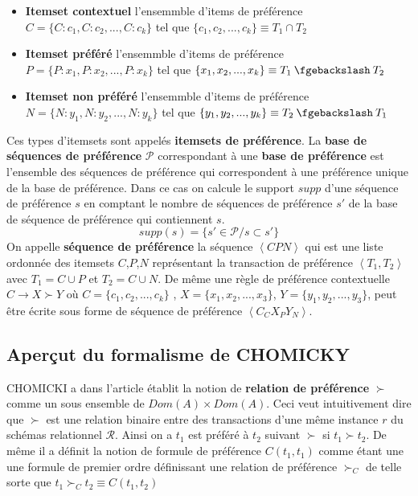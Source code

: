 \documentclass[a4paper,12pt,openany,oneside]{article}
\newcommand{\mysetminus}{\mathbin{\fgebackslash}}
\begin{document}
\begin{itemize}
\item \textbf{Itemset contextuel} l'ensemmble d'items de préférence $C=\{C:c_1,C:c_2,...,C:c_k\}$ tel que $\{c_1,c_2,...,c_k\}\equiv T_1\cap T_2$
\item \textbf{Itemset préféré} l'ensemmble d'items de préférence $P=\{P:x_1,P:x_2,...,P:x_k\}$ tel que $\{x_1,x_2,...,x_k\}\equiv T_1 \mysetminus T_2$
\item \textbf{Itemset non préféré} l'ensemmble d'items de préférence $N=\{N:y_1,N:y_2,...,N:y_k\}$ tel que $\{y_1,y_2,...,y_k\}\equiv T_2\mysetminus T_1$
\end{itemize} 
Ces types d'itemsets sont appelés \textbf{itemsets de préférence}.
La \textbf{base de séquences de préférence} $\mathcal{P}$ correspondant à une \textbf{base de préférence} est l'ensemble des séquences de préférence qui correspondent à une préférence unique de la base de préférence.
Dans ce cas on calcule le support $supp$ d'une séquence de préférence $s$ en comptant le nombre de séquences de préférence $s'$ de la base de séquence de préférence qui contiennent $s$.  
\[
	supp(s)=\{s'\in \mathcal{P}/s\subset s'\}
\]
On appelle \textbf{séquence de préférence} la séquence $\left<CPN\right>$ qui est une liste ordonnée des itemsets $C$,$P$,$N$ représentant la transaction de préférence $\left<T_1,T_2\right>$ avec $T_1=C\cup P$ et $T_2=C\cup N$. De même une règle de préférence contextuelle $C\rightarrow X\succ Y$ où $C=\{c_1,c_2,...,c_k\}$ , $X=\{x_1,x_2,...,x_3\}$, $Y=\{y_1,y_2,...,y_3\}$, peut être écrite sous forme de séquence de préférence $\left<C_C X_P Y_N\right>$.

\subsection{Aperçut du formalisme de CHOMICKY}
 	CHOMICKI a dans l'article \cite{CHO} établit la notion de \textbf{relation de préférence} $\succ$ comme un  sous ensemble de $Dom(A)\times Dom(A)$. Ceci veut intuitivement dire que $\succ$ est une relation binaire entre des transactions d'une même instance $r$ du schémas relationnel $\mathcal{R}$. Ainsi on a $t_{1}$ est préféré à $t_{2}$ suivant $\succ$ si $t_{1}\succ t_{2}$. De même il a définit la notion de formule de préférence $C(t_{1},t_{1})$ comme étant une une formule de premier ordre définissant une relation de préférence $\succ_{C}$ de telle sorte que $t_{1}\succ_{C} t_{2}\equiv C(t_{1},t_{2})$ \\
 	
\end{document}
